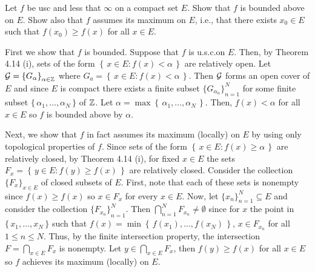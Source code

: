 \begin{problem}
  Let \(f\) be usc and less that \(\infty\) on a compact set \(E\). Show
  that \(f\) is bounded above on \(E\). Show also that \(f\) assumes its
  maximum on \(E\), i.e., that there exists \(x_0\in E\) such that
  \(f(x_0)\geq f(x)\) for all \(x\in E\).
\end{problem}
\begin{solution}
  First we show that \(f\) is bounded. Suppose that \(f\) is u.s.c.\@ on
  \(E\). Then, by Theorem 4.14 (i), sets of the form
  \(\left\{\,x\in E:f(x)<\alpha\,\right\}\) are relatively open. Let
  \(\mathcal{G}={\{G_\alpha\}}_{\alpha\in\mathbb{Z}}\) where
  \(G_a=\left\{\,x\in E:f(x)<\alpha\,\right\}\). Then \(\mathcal{G}\) forms an
  open cover of \(E\) and since \(E\) is compact there exists a finite
  subset \({\{G_{\alpha_n}\}}_{n=1}^N\) for some finite subset
  \(\{\,\alpha_1,\dotsc,\alpha_N\,\}\) of \(\mathbb{Z}\). Let
  \(\alpha=\max\left\{\,\alpha_1,\dotsc,\alpha_N\,\right\}\). Then,
  \(f(x)<\alpha\) for all \(x\in E\) so \(f\) is bounded above by
  \(\alpha\).

  Next, we show that \(f\) in fact assumes its maximum (locally) on \(E\)
  by using only topological properties of \(f\). Since sets of the form
  \(\left\{\,x\in E:f(x)\geq\alpha\,\right\}\) are relatively closed, by
  Theorem 4.14 (i), for fixed \(x\in E\) the sets
  \(F_x=\left\{\,y\in E:f(y)\geq f(x)\,\right\}\) are relatively
  closed. Consider the collection \({\{F_x\}}_{x\in E}\) of closed subsets
  of \(E\). First, note that each of these sets is nonempty since
  \(f(x)\geq f(x)\) so \(x\in F_x\) for every \(x\in E\). Now, let
  \({\{x_n\}}_{n=1}^N\subseteq E\) and consider the collection
  \({\{F_{x_n}\}}_{n=1}^N\). Then \(\bigcap_{n=1}^N F_{x_n}\neq\emptyset\)
  since for \(x\) the point in \(\{\,x_1,\dotsc,x_N\,\}\) such that
  \(f(x)=\min\left\{\,f(x_1),\dotsc,f(x_N)\,\right\}\), \(x\in F_{x_n}\)
  for all \(1\leq n\leq N\). Thus, by the finite intersection property, the
  intersection \(F=\bigcap_{x\in E}F_x\) is nonempty. Let
  \(y\in\bigcap_{x\in E} F_x\), then \(f(y)\geq f(x)\) for all \(x\in E\)
  so \(f\) achieves its maximum (locally) on \(E\).
\end{solution}

